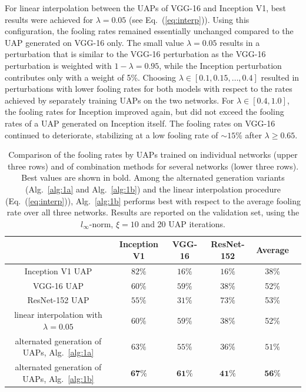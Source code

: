 \documentclass[runningheads]{llncs}
\begin{document}
For linear interpolation between the UAPs of VGG-16 and Inception V1, best results were achieved for \(\lambda=0.05\) (see Eq.~(\ref{eq:interp})). Using this configuration, the fooling rates remained essentially unchanged compared to the UAP generated on VGG-16 only.
The small value \(\lambda=0.05\) results in a perturbation that is similar to the VGG-16 perturbation as the VGG-16 perturbation is weighted with \(1-\lambda=0.95\), while the Inception perturbation contributes only with a weight of 5\%. Choosing \(\lambda\in\left[0.1,0.15,\ldots,0.4\right]\) resulted in perturbations with lower fooling rates for both models with respect to the rates achieved by separately training UAPs on the two networks. For \(\lambda \in\left[0.4,1.0\right]\), the fooling rates for Inception improved again, but did not exceed the fooling rates of a UAP generated on Inception itself. The fooling rates on VGG-16 continued to deteriorate, stabilizing at a low fooling rate of \(\sim 15\%\) after \(\lambda\geq 0.65\).
\begin{table}
\centering

\begin{tabular}{|c|c|c|c|c|c|}
\hline
											&	Inception	V1&	VGG-16		&	ResNet-152	& Average	\\ \hline
Inception V1 UAP							&	\(82\%\)		&	\(16\%\)	&	\(16\%\)	&38\%	\\
VGG-16 UAP								&	\(60\%\)		&	\(59\%\)	&	\(38\%\)	&52\%	\\
ResNet-152 UAP &	\(55\%\)		&	\(31\%\)	&	\(73\%\)&53\%		\\ \hline
linear interpolation with \(\lambda=0.05\)	&	\(60\%\)		&	\(59\%\)	&	\(38\%\)	&52\%\\
alternated generation of UAPs, Alg.~\ref{alg:1a}&	\(63\%\)		&	\(55\%\)	&	\(36\%\)	& \(51\%\)	\\
alternated generation of UAPs, Alg.~\ref{alg:1b}&	\(\mathbf{67}\%\)		&	\(\mathbf{61}\%\)	&	\(\mathbf{41}\%\)		&\(\mathbf{56}\)\%\\

\hline 
\end{tabular}

\caption{Comparison of the fooling rates by UAPs trained on individual networks (upper three rows) and of combination methods for several networks (lower three rows). Best values are shown in bold. Among the alternated generation variants (Alg.~\ref{alg:1a} and Alg.~\ref{alg:1b}) and the linear interpolation procedure (Eq.~(\ref{eq:interp})), Alg.~\ref{alg:1b} performs best with respect to the average fooling rate over all three networks. Results are reported on the validation set, using the $l_\infty$-norm, $\xi=10$ and 20 UAP iterations.}\label{tab:vergleich_comb}
\end{table}
\end{document}
